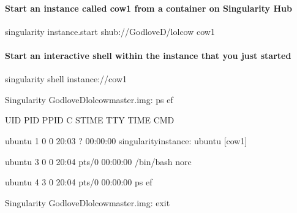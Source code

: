 \documentclass[letterpaper,10pt,english]{sphinxmanual}
\begin{document}
\paragraph{Start an instance called cow1 from a container on Singularity Hub}
\label{\detokenize{appendix:start-an-instance-called-cow1-from-a-container-on-singularity-hub}}
%
\begin{sphinxVerbatim}[commandchars=\\\{\}]
\PYGZdl{} singularity instance.start shub://GodloveD/lolcow cow1
\end{sphinxVerbatim}


\paragraph{Start an interactive shell within the instance that you just started}
\label{\detokenize{appendix:start-an-interactive-shell-within-the-instance-that-you-just-started}}
%
\begin{sphinxVerbatim}[commandchars=\\\{\}]
\PYGZdl{} singularity shell instance://cow1

Singularity GodloveD\PYGZhy{}lolcow\PYGZhy{}master.img:\PYGZti{}\PYGZgt{} ps \PYGZhy{}ef

UID        PID  PPID  C STIME TTY          TIME CMD

ubuntu       1     0  0 20:03 ?        00:00:00 singularity\PYGZhy{}instance: ubuntu [cow1]

ubuntu       3     0  0 20:04 pts/0    00:00:00 /bin/bash \PYGZhy{}\PYGZhy{}norc

ubuntu       4     3  0 20:04 pts/0    00:00:00 ps \PYGZhy{}ef

Singularity GodloveD\PYGZhy{}lolcow\PYGZhy{}master.img:\PYGZti{}\PYGZgt{} exit
\end{sphinxVerbatim}
\end{document}
